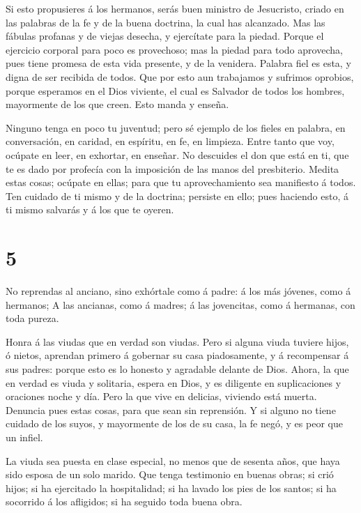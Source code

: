  Si esto propusieres á los hermanos, serás buen ministro de
Jesucristo, criado en las palabras de la fe y de la buena doctrina, la
cual has alcanzado.  Mas las fábulas profanas y de viejas
desecha, y ejercítate para la piedad.  Porque el ejercicio
corporal para poco es provechoso; mas la piedad para todo aprovecha,
pues tiene promesa de esta vida presente, y de la venidera. 
Palabra fiel es esta, y digna de ser recibida de todos. 
Que por esto aun trabajamos y sufrimos oprobios, porque esperamos en el
Dios viviente, el cual es Salvador de todos los hombres, mayormente de
los que creen.  Esto manda y enseña.

 Ninguno tenga en poco tu juventud; pero sé ejemplo de los
fieles en palabra, en conversación, en caridad, en espíritu, en fe, en
limpieza.  Entre tanto que voy, ocúpate en leer, en
exhortar, en enseñar.  No descuides el don que está en ti,
que te es dado por profecía con la imposición de las manos del
presbiterio.  Medita estas cosas; ocúpate en ellas; para
que tu aprovechamiento sea manifiesto á todos.  Ten cuidado
de ti mismo y de la doctrina; persiste en ello; pues haciendo esto, á ti
mismo salvarás y á los que te oyeren.

\hypertarget{section-4}{%
\section{5}\label{section-4}}

 No reprendas al anciano, sino exhórtale como á padre: á los
más jóvenes, como á hermanos;  A las ancianas, como á
madres; á las jovencitas, como á hermanas, con toda pureza.

 Honra á las viudas que en verdad son viudas. 
Pero si alguna viuda tuviere hijos, ó nietos, aprendan primero á
gobernar su casa piadosamente, y á recompensar á sus padres: porque esto
es lo honesto y agradable delante de Dios.  Ahora, la que en
verdad es viuda y solitaria, espera en Dios, y es diligente en
suplicaciones y oraciones noche y día.  Pero la que vive en
delicias, viviendo está muerta.  Denuncia pues estas cosas,
para que sean sin reprensión.  Y si alguno no tiene cuidado
de los suyos, y mayormente de los de su casa, la fe negó, y es peor que
un infiel.

 La viuda sea puesta en clase especial, no menos que de
sesenta años, que haya sido esposa de un solo marido.  Que
tenga testimonio en buenas obras; si crió hijos; si ha ejercitado la
hospitalidad; si ha lavado los pies de los santos; si ha socorrido á los
afligidos; si ha seguido toda buena obra.


